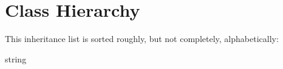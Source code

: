 \section{Class Hierarchy}
This inheritance list is sorted roughly, but not completely, alphabetically\+:\begin{DoxyCompactList}
\item {}
\item string\begin{DoxyCompactList}
\item {}
\end{DoxyCompactList}
\end{DoxyCompactList}
